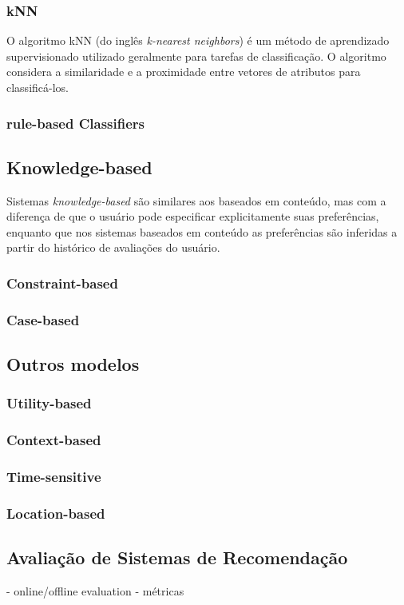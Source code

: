 \subsubsection{kNN}
O algoritmo kNN (do inglês \textit{k-nearest neighbors}) é um método de
aprendizado supervisionado utilizado geralmente para tarefas de classificação. O
algoritmo considera a similaridade e a proximidade entre vetores de atributos
para classificá-los.
\subsubsection{rule-based Classifiers}

\subsection{Knowledge-based}
Sistemas \textit{knowledge-based} são similares aos baseados em conteúdo, mas
com a diferença de que o usuário pode especificar explicitamente suas
preferências, enquanto
que nos sistemas baseados em conteúdo as preferências são inferidas a partir do
histórico de avaliações do usuário.
\subsubsection{Constraint-based}
\subsubsection{Case-based}


\subsection{Outros modelos}
\subsubsection{Utility-based}
\subsubsection{Context-based}
\subsubsection{Time-sensitive}
\subsubsection{Location-based}

\subsection{Avaliação de Sistemas de Recomendação}
- online/offline evaluation
- métricas